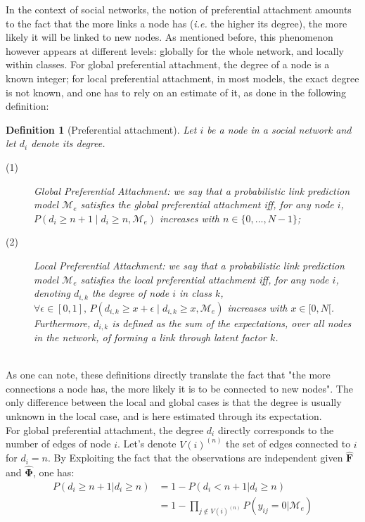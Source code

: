 \documentclass[conference]{IEEEtran}
\newcommand{\pr}{P}
\newcommand{\mat}[1]{\mathbf{#1}}
\newtheorem{definition}{Definition}[section]
\begin{document}
In the context of social networks, the notion of preferential attachment amounts to the fact that the more links a node has (\textit{i.e.} the higher its degree), the more likely it will be linked to new nodes. As mentioned before, this phenomenon however appears at different levels: globally for the whole network, and locally within classes. For global preferential attachment, the degree of a node is a known integer; for local preferential attachment, in most models, the exact degree is not known, and one has to rely on an estimate of it, as done in the following definition:~\\
%
\begin{definition}[Preferential attachment]
Let $i$ be a node in a social network and let $d_i$ denote its degree. 
\begin{description}
    \item[(1)] \emph{Global Preferential Attachment}: we say that a probabilistic link prediction model $\mathcal{M}_e$ satisfies the global preferential attachment iff, for any node $i$, $\pr(d_i \ge n+1 \mid d_i \ge n, \mathcal{M}_e)$ increases with $n \in \{0,..., N-1\}$;
 \item[(2)] \emph{Local Preferential Attachment}: we say that a probabilistic link prediction model $\mathcal{M}_e$ satisfies the local preferential attachment iff, for any node $i$, denoting $d_{i,k}$ the degree of node $i$ in class $k$, $\forall \epsilon \in [0,1], \, \pr(d_{i,k} \ge x+\epsilon \mid d_{i,k} \ge x, \mathcal{M}_e)$ increases with $x \in [0,N[$. Furthermore, $d_{i,k}$ is defined as the sum of the expectations, over all nodes in the network, of forming a link through latent factor $k$.
\end{description}
\label{def:burst-soc-net}
\end{definition}~\\


As one can note, these definitions directly translate the fact that "the more connections a node has, the more likely it is to be connected to new nodes". The only difference between the local and global cases is that the degree is usually unknown in the local case, and is here estimated through its expectation.~\\



For global preferential attachment, the degree $d_i$ directly corresponds to the number of edges of node $i$. Let's denote $V(i)^{(n)}$ the set of edges connected to $i$ for $d_i = n$. By Exploiting the fact that the observations are independent given $\mat{\hat{F}}$ and $\mat{\hat{\Phi}}$, one has:
%
\begin{align*}
    P(d_i \geq n+1 | d_i \geq n) &= 1 - P(d_i < n+1 | d_i \geq n) \\
                                 &= 1 - \prod_{j\notin V(i)^{(n)}} P(y_{ij}=0 | \mathcal{M}_e)
\end{align*}
\end{document}
